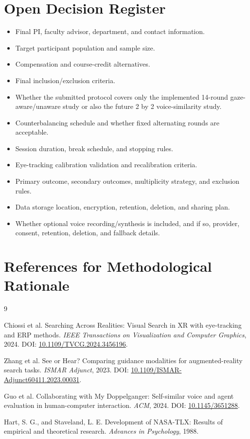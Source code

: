 \documentclass[11pt,letterpaper]{article}
\begin{document}
\section{Open Decision Register}

\begin{itemize}
  \item Final PI, faculty advisor, department, and contact information.
  \item Target participant population and sample size.
  \item Compensation and course-credit alternatives.
  \item Final inclusion/exclusion criteria.
  \item Whether the submitted protocol covers only the implemented 14-round gaze-aware/unaware study or also the future 2 by 2 voice-similarity study.
  \item Counterbalancing schedule and whether fixed alternating rounds are acceptable.
  \item Session duration, break schedule, and stopping rules.
  \item Eye-tracking calibration validation and recalibration criteria.
  \item Primary outcome, secondary outcomes, multiplicity strategy, and exclusion rules.
  \item Data storage location, encryption, retention, deletion, and sharing plan.
  \item Whether optional voice recording/synthesis is included, and if so, provider, consent, retention, deletion, and fallback details.
\end{itemize}

\section{References for Methodological Rationale}

\begin{thebibliography}{9}

Chiossi et al. Searching Across Realities: Visual Search in XR with eye-tracking and ERP methods. \textit{IEEE Transactions on Visualization and Computer Graphics}, 2024. DOI: \href{https://doi.org/10.1109/TVCG.2024.3456196}{10.1109/TVCG.2024.3456196}.

Zhang et al. See or Hear? Comparing guidance modalities for augmented-reality search tasks. \textit{ISMAR Adjunct}, 2023. DOI: \href{https://doi.org/10.1109/ISMAR-Adjunct60411.2023.00031}{10.1109/ISMAR-Adjunct60411.2023.00031}.

Guo et al. Collaborating with My Doppelganger: Self-similar voice and agent evaluation in human-computer interaction. \textit{ACM}, 2024. DOI: \href{https://doi.org/10.1145/3651288}{10.1145/3651288}.

Hart, S. G., and Staveland, L. E. Development of NASA-TLX: Results of empirical and theoretical research. \textit{Advances in Psychology}, 1988.

\end{thebibliography}
\end{document}
